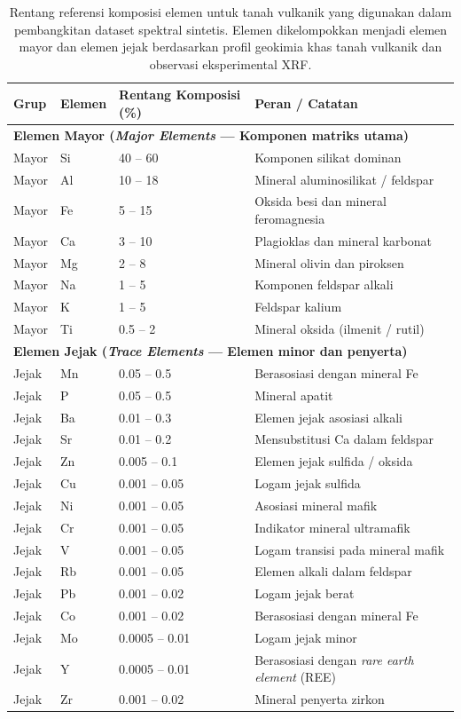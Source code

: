 \documentclass[12pt, a4paper]{article}
\begin{document}
\begin{table}[H]
\centering
\caption{Rentang referensi komposisi elemen untuk tanah vulkanik yang digunakan dalam pembangkitan dataset spektral sintetis. Elemen dikelompokkan menjadi elemen mayor dan elemen jejak berdasarkan profil geokimia khas tanah vulkanik dan observasi eksperimental XRF.}
\label{tab:komposisi-tanah}
\small
\begin{tabular}{lllp{6cm}}
\toprule
\textbf{Grup} & \textbf{Elemen} & \textbf{Rentang Komposisi (\%)} & \textbf{Peran / Catatan} \\
\midrule
\multicolumn{4}{l}{\textbf{Elemen Mayor (\textit{Major Elements} --- Komponen matriks utama)}} \\
Mayor & Si & 40 -- 60 & Komponen silikat dominan \\
Mayor & Al & 10 -- 18 & Mineral aluminosilikat / feldspar \\
Mayor & Fe & 5 -- 15 & Oksida besi dan mineral feromagnesia \\
Mayor & Ca & 3 -- 10 & Plagioklas dan mineral karbonat \\
Mayor & Mg & 2 -- 8 & Mineral olivin dan piroksen \\
Mayor & Na & 1 -- 5 & Komponen feldspar alkali \\
Mayor & K & 1 -- 5 & Feldspar kalium \\
Mayor & Ti & 0.5 -- 2 & Mineral oksida (ilmenit / rutil) \\
\midrule
\multicolumn{4}{l}{\textbf{Elemen Jejak (\textit{Trace Elements} --- Elemen minor dan penyerta)}} \\
Jejak & Mn & 0.05 -- 0.5 & Berasosiasi dengan mineral Fe \\
Jejak & P & 0.05 -- 0.5 & Mineral apatit \\
Jejak & Ba & 0.01 -- 0.3 & Elemen jejak asosiasi alkali \\
Jejak & Sr & 0.01 -- 0.2 & Mensubstitusi Ca dalam feldspar \\
Jejak & Zn & 0.005 -- 0.1 & Elemen jejak sulfida / oksida \\
Jejak & Cu & 0.001 -- 0.05 & Logam jejak sulfida \\
Jejak & Ni & 0.001 -- 0.05 & Asosiasi mineral mafik \\
Jejak & Cr & 0.001 -- 0.05 & Indikator mineral ultramafik \\
Jejak & V & 0.001 -- 0.05 & Logam transisi pada mineral mafik \\
Jejak & Rb & 0.001 -- 0.05 & Elemen alkali dalam feldspar \\
Jejak & Pb & 0.001 -- 0.02 & Logam jejak berat \\
Jejak & Co & 0.001 -- 0.02 & Berasosiasi dengan mineral Fe \\
Jejak & Mo & 0.0005 -- 0.01 & Logam jejak minor \\
Jejak & Y & 0.0005 -- 0.01 & Berasosiasi dengan \textit{rare earth element} (REE) \\
Jejak & Zr & 0.001 -- 0.02 & Mineral penyerta zirkon \\
\bottomrule
\end{tabular}
\end{table}
\end{document}
